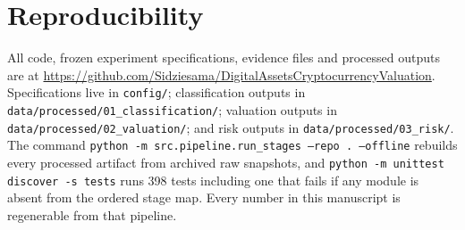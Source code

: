 \documentclass[10pt]{article}
\begin{document}
\section*{Reproducibility}
All code, frozen experiment specifications, evidence files and processed outputs are at \url{https://github.com/Sidziesama/DigitalAssetsCryptocurrencyValuation}. Specifications live in \texttt{config/}; classification outputs in \texttt{data/processed/01\_classification/}; valuation outputs in \texttt{data/processed/02\_valuation/}; and risk outputs in \texttt{data/processed/03\_risk/}. The command \texttt{python -m src.pipeline.run\_stages --repo . --offline} rebuilds every processed artifact from archived raw snapshots, and \texttt{python -m unittest discover -s tests} runs 398 tests including one that fails if any module is absent from the ordered stage map. Every number in this manuscript is regenerable from that pipeline.




\appendix
\end{document}
